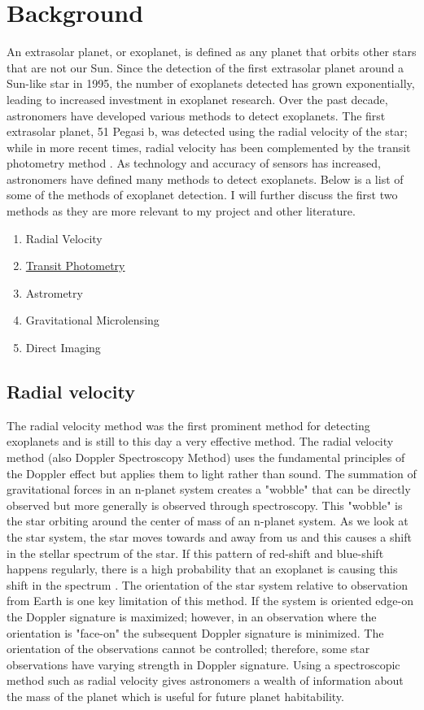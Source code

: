 \documentclass[12pt]{article}
\begin{document}
\section{Background}
\label{sec:backgrnd}
An extrasolar planet, or exoplanet, is defined as any planet that orbits other stars that are not our Sun. Since the detection of the first extrasolar planet around a Sun-like star in 1995, the number of exoplanets detected has grown exponentially, leading to increased investment in exoplanet research. Over the past decade, astronomers have developed various methods to detect exoplanets. The first extrasolar planet, 51 Pegasi b, was detected using the radial velocity of the star; while in more recent times, radial velocity has been complemented by the transit photometry method \cite{mayor1995jupiter}. As technology and accuracy of sensors has increased, astronomers have defined many methods to detect exoplanets. Below is a list of some of the methods of exoplanet detection. I will further discuss the first two methods as they are more relevant to my project and other literature.

\begin{enumerate}
\item Radial Velocity
\item \hyperref[subsec:transitp]{Transit Photometry}
\item Astrometry
\item Gravitational Microlensing
\item Direct Imaging
\end{enumerate}

\subsection{Radial velocity}
\label{subsec:rv}
The radial velocity method was the first prominent method for detecting exoplanets and is still to this day a very effective method. The radial velocity method (also Doppler Spectroscopy Method) uses the fundamental principles of the Doppler effect but applies them to light rather than sound. The summation of gravitational forces in an n-planet system creates a "wobble" that can be directly observed but more generally is observed through spectroscopy. This "wobble" is the star orbiting around the center of mass of an n-planet system. As we look at the star system, the star moves towards and away from us and this causes a shift in the stellar spectrum of the star. If this pattern of red-shift and blue-shift happens regularly, there is a high probability that an exoplanet is causing this shift in the spectrum \cite{wright2017radial}. The orientation of the star system relative to observation from Earth is one key limitation of this method. 
If the system is oriented edge-on the Doppler signature is maximized; however, in an observation where the orientation is "face-on" the subsequent Doppler signature is minimized. The orientation of the observations cannot be controlled; therefore, some star observations have varying strength in Doppler signature. Using a spectroscopic method such as radial velocity gives astronomers a wealth of information about the mass of the planet which is useful for future planet habitability. 
\end{document}
